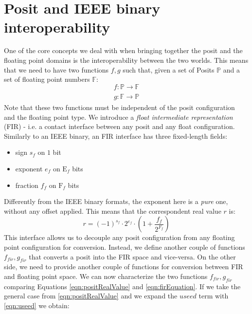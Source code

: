 \section{Posit and IEEE binary interoperability}\label{sec:fir}

One of the core concepts we deal with when bringing together the posit and the floating point domains is the interoperability between the two worlds. This means that we need to have two functions $f,g$ such that, given a set of Posits $\mathbb{P}$ and a set of floating point numbers $\mathbb{F}$:
\begin{equation}
    f: \mathbb{P} \xrightarrow[]{} \mathbb{F}
\end{equation}
\begin{equation}
    g: \mathbb{F} \xrightarrow[]{} \mathbb{P}
\end{equation}
Note that these two functions must be independent of the posit configuration \\ and the floating point type.
We introduce a \textit{float intermediate representation} (FIR) - i.e. a contact interface between any posit and any float configuration. Similarly to an IEEE binary, an FIR interface has three fixed-length fields:
\begin{itemize}
    \item sign $s_f$ on $1$ bit
    \item exponent $e_f$ on $\text{E}_f$ bits
    \item fraction $f_f$ on $\text{F}_f$ bits
\end{itemize}
Differently from the IEEE binary formats, the exponent here is a \textit{pure} one, without any offset applied. This means that the correspondent real value $r$ is:
\begin{equation}\label{eqn:firEquation}
    r = (-1)^{s_f} \cdot 2^{e_f} \cdot \left(1 + \frac{f_f}{2^{F_f}} \right)
\end{equation}
This interface allows us to decouple any posit configuration from any floating point configuration for conversion. Instead, we define another couple of functions $f_{fir}, 
g_{fir}$ that converts a posit into the FIR space and vice-versa.
On the other side, we need to provide another couple of functions for conversion between FIR and floating point space.
We can now characterize the two functions $f_{fir}, g_{fir}$ comparing Equations \eqref{eqn:positRealValue} and \eqref{eqn:firEquation}. If we take the general case from \eqref{eqn:positRealValue} and we expand the $useed$ term with \eqref{eqn:useed} we obtain:
